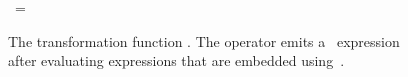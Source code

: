 \begin{figure}[p]
\begin{minipage}[t]{\linewidth}
\begin{minipage}[t]{.962\linewidth}
      \tabTTT \algLet \var[m]
      \ = \freshvar
      \ \algIn \\
      \tabTTTT\hspace{-2.3ex}
      \fi
    \end{minipage}
  \end{minipage}
  \caption{The transformation function \product.  
    The operator \quo{$\;\cdot\;$} emits a \miniocaml\ expression after evaluating
    expressions that are embedded using~\aq{$\;\cdot\;$}.  }
  \label{fig-prod-alg}
\end{figure}
\iffalse  

